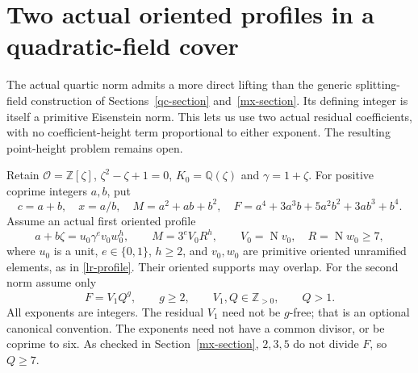 \section{Two actual oriented profiles in a quadratic-field cover}
\label{dc-section}

The actual quartic norm admits a more direct lifting than the generic
splitting-field construction of Sections~\ref{qc-section}
and~\ref{mx-section}. Its defining integer is itself a primitive
Eisenstein norm. This lets us use two actual residual coefficients,
with no coefficient-height term proportional to either exponent.
The resulting point-height problem remains open.

Retain $\mathcal O=\mathbb Z[\zeta]$, $\zeta^2-\zeta+1=0$,
$K_0=\mathbb Q(\zeta)$ and $\gamma=1+\zeta$. For positive coprime
integers $a,b$, put
\[
 c=a+b,\quad x=a/b,\quad M=a^2+ab+b^2,
 \quad F=a^4+3a^3b+5a^2b^2+3ab^3+b^4.
\]
Assume an actual first oriented profile
\begin{equation}\label{dc-first-profile}
 a+b\zeta=u_0\gamma^e v_0w_0^h,\qquad
 M=3^eV_0R^h,\qquad
 V_0=\operatorname N v_0,\quad R=\operatorname N w_0\ge7,
\end{equation}
where $u_0$ is a unit, $e\in\{0,1\}$, $h\ge2$, and
$v_0,w_0$ are primitive oriented unramified elements, as in
\eqref{lr-profile}. Their oriented supports may overlap.
For the second norm assume only
\begin{equation}\label{dc-second-profile}
 F=V_1Q^g,\qquad g\ge2,\qquad V_1,Q\in\mathbb Z_{>0},\qquad Q>1.
\end{equation}
All exponents are integers. The residual $V_1$ need not be $g$-free;
that is an optional canonical convention. The exponents need not
have a common divisor, or be coprime to six. As checked in
Section~\ref{mx-section}, $2,3,5$ do not divide $F$, so $Q\ge7$.

